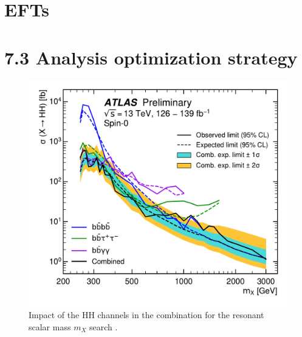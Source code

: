 \section{EFTs}

\section{7.3 Analysis optimization strategy}

\begin{figure}
    \centering
    \includegraphics[width=0.9 \textwidth]{figures/ATLAS-CONF-2021-052/fig_08.pdf}
    \caption{Impact of the HH channels in the combination for the resonant scalar mass $m_X$ search \cite{ATLAS-CONF-2021-052} .}
    \label{fig:truth-hh-presel}
\end{figure}


